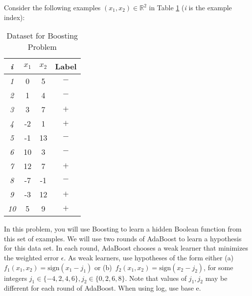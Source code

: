 \documentclass[11pt]{article}
\begin{document}
\newpage
{}
  Consider the following examples $(x_1,x_2) \in \mathbb{R}^2$ in Table \ref{table:data_boost} ({\em i} is the example index):
  \begin{table}[ht]
    \begin{center}
        \begin{tabular}{|c|c|c|c|}
          \hline
          {\em i}  & $x_1$  & $x_2$ & Label \\
          \hline
          {\em 1}  & 0  & 5 & $-$ \\ 
          \hline
          {\em 2}  & 1  & 4 & $-$ \\
          \hline
          {\em 3}  & 3  & 7 & $+$ \\
          \hline
          {\em 4}  & -2  & 1 & $+$ \\ 
          \hline
          {\em 5}  & -1  & 13 & $-$ \\
          \hline
          {\em 6}  & 10  & 3 & $-$ \\
          \hline
          {\em 7}  & 12 & 7 & $+$ \\
          \hline
          {\em 8}  & -7  & -1 & $-$ \\
          \hline
          {\em 9}  & -3  & 12 & $+$ \\
          \hline
          {\em 10} & 5  & 9 & $+$ \\
          \hline
        \end{tabular}
    \end{center}
    \caption{Dataset for Boosting Problem}\label{table:data_boost}
  \end{table}

In this problem, you will use Boosting to learn a hidden Boolean function from this set of examples.
We will use two rounds of AdaBoost to learn a hypothesis for this
    data set. In each round, AdaBoost chooses a weak learner that minimizes the weighted error $\epsilon$. As weak learners, use hypotheses of the form either (a)~$f_1(x_1, x_2) = \text{sign}(x_1- j_1)$ or (b)~$f_2(x_1, x_2) = \text{sign}(x_2 - j_2)$, for some integers $j_1\in\{-4,2,4,6\},j_2\in\{0, 2, 6, 8\}$. Note that values of $j_1, j_2$ may be different for each round of AdaBoost. When using log, use base e.
\end{document}
